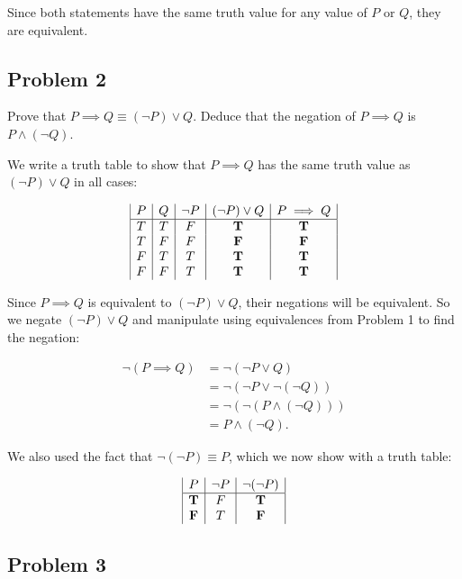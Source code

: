 \documentclass[11pt]{article}
\begin{document}
Since both statements have the same truth value for any value of $P$ or $Q$, they
are equivalent.

\subsection*{Problem 2}

Prove that $P \implies Q \equiv (\lnot P) \lor Q$. Deduce that the negation of
$P \implies Q$ is $P \land (\lnot Q)$.

We write a truth table to show that $P \implies Q$ has the same truth value as
$(\lnot P)\lor Q$ in all cases:

$$
\begin{array}{|c|c|c|c|c|}
P & Q & \lnot P & (\lnot P) \lor Q & P \implies Q \\
\hline
T & T & F & \bf T & \bf T \\
T & F & F & \bf F & \bf F \\
F & T & T & \bf T & \bf T \\
F & F & T & \bf T & \bf T \\
\end{array}
$$

Since $P \implies Q$ is equivalent to $(\lnot P) \lor Q$, their negations will be
equivalent. So we negate  $(\lnot P) \lor Q$ and manipulate using equivalences from
Problem 1 to find the negation:

$$
\begin{array}{rl}
\lnot (P \implies Q) &= \lnot (\lnot P \lor Q) \\
&= \lnot(\lnot P \lor \lnot (\lnot Q)) \\
&= \lnot (\lnot (P \land (\lnot Q))) \\
&= P \land (\lnot Q).
\end{array}
$$

We also used the fact that $\lnot (\lnot P) \equiv P$, which we now show with a
truth table:

$$
\begin{array}{|c|c|c|}
P & \lnot P & \lnot (\lnot P) \\
\hline
\bf T & F & \bf T \\
\bf F & T & \bf F \\
\end{array}
$$

\subsection*{Problem 3}
\end{document}
